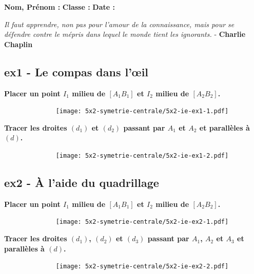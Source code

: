 



\textbf{Nom, Prénom :} \hspace{8cm} \textbf{Classe :} \hspace{3cm} \textbf{Date :}\\

\begin{center}
  \textit{Il faut apprendre, non pas pour l'amour de la connaissance, mais pour se défendre contre le mépris dans lequel le monde tient les ignorants.}  - \textbf{Charlie Chaplin}
\end{center}

\begin{multicols}{2}
  \subsection*{ex1 - Le compas dans l'œil}

  \textbf{Placer un point $I_1$ milieu de $[A_1 B_1]$ et $I_2$ milieu de $[A_2 B_2]$.}
  \begin{figure}[H]
        \centering
        \texttt{[image: 5x2-symetrie-centrale/5x2-ie-ex1-1.pdf]}
  \end{figure}
  \columnbreak

  \textbf{Tracer les droites $(d_1)$ et $(d_2)$ passant par $A_1$ et $A_2$ et parallèles à $(d)$.}
  \begin{figure}[H]
        \centering
        \texttt{[image: 5x2-symetrie-centrale/5x2-ie-ex1-2.pdf]}
  \end{figure}
\end{multicols}

\subsection*{ex2 - À l'aide du quadrillage}

\begin{multicols}{2}

  \textbf{Placer un point $I_1$ milieu de $[A_1 B_1]$ et $I_2$ milieu de $[A_2 B_2]$.}
  \begin{figure}[H]
        \centering
        \texttt{[image: 5x2-symetrie-centrale/5x2-ie-ex2-1.pdf]}
  \end{figure}
  \columnbreak

  \textbf{Tracer les droites $(d_1)$, $(d_2)$ et $(d_3)$ passant par $A_1$, $A_2$ et $A_3$ et parallèles à $(d)$.}
  \begin{figure}[H]
        \centering
        \texttt{[image: 5x2-symetrie-centrale/5x2-ie-ex2-2.pdf]}
  \end{figure}
\end{multicols}

